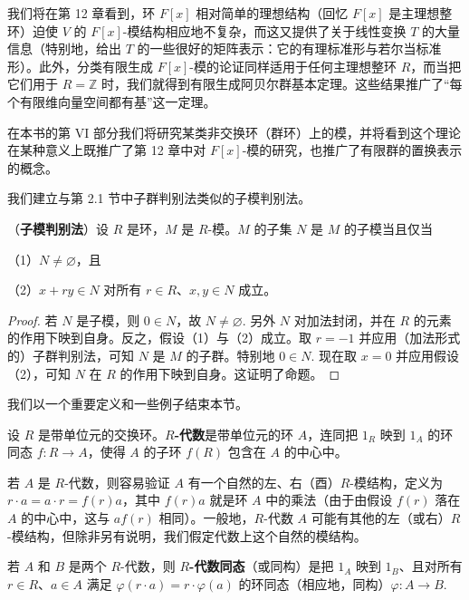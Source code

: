 我们将在第 12 章看到，环 \(F[x]\) 相对简单的理想结构（回忆 \(F[x]\) 是主理想整环）迫使 \(V\) 的 \(F[x]\)-模结构相应地不复杂，而这又提供了关于线性变换 \(T\) 的大量信息（特别地，给出 \(T\) 的一些很好的矩阵表示：它的有理标准形与若尔当标准形）。此外，分类有限生成 \(F[x]\)-模的论证同样适用于任何主理想整环 \(R\)，而当把它们用于 \(R = \mathbb{Z}\) 时，我们就得到有限生成阿贝尔群基本定理。这些结果推广了“每个有限维向量空间都有基”这一定理。

在本书的第 VI 部分我们将研究某类非交换环（群环）上的模，并将看到这个理论在某种意义上既推广了第 12 章中对 \(F[x]\)-模的研究，也推广了有限群的置换表示的概念。

我们建立与第 2.1 节中子群判别法类似的子模判别法。

\begin{proposition}\label{pro:10.1}
（\textbf{子模判别法}）设 \(R\) 是环，\(M\) 是 \(R\)-模。\(M\) 的子集 \(N\) 是 \(M\) 的子模当且仅当

（1）\(N \neq \varnothing\)，且

（2）\(x+ry \in N\) 对所有 \(r \in R\)、\(x, y \in N\) 成立。
\end{proposition}

\begin{proof}
若 \(N\) 是子模，则 \(0 \in N\)，故 \(N \neq \varnothing\). 另外 \(N\) 对加法封闭，并在 \(R\) 的元素的作用下映到自身。反之，假设（1）与（2）成立。取 \(r = -1\) 并应用（加法形式的）子群判别法，可知 \(N\) 是 \(M\) 的子群。特别地 \(0 \in N\). 现在取 \(x = 0\) 并应用假设（2），可知 \(N\) 在 \(R\) 的作用下映到自身。这证明了命题。
\end{proof}

我们以一个重要定义和一些例子结束本节。

\begin{definition}
设 \(R\) 是带单位元的交换环。\textbf{\(R\)-代数}是带单位元的环 \(A\)，连同把 \(1_R\) 映到 \(1_A\) 的环同态 \(f : R \to A\)，使得 \(A\) 的子环 \(f(R)\) 包含在 \(A\) 的中心中。
\end{definition}

若 \(A\) 是 \(R\)-代数，则容易验证 \(A\) 有一个自然的左、右（酉）\(R\)-模结构，定义为 \(r \cdot a = a \cdot r = f(r)a\)，其中 \(f(r)a\) 就是环 \(A\) 中的乘法（由于由假设 \(f(r)\) 落在 \(A\) 的中心中，这与 \(af(r)\) 相同）。一般地，\(R\)-代数 \(A\) 可能有其他的左（或右）\(R\)-模结构，但除非另有说明，我们假定代数上这个自然的模结构。

\begin{definition}
若 \(A\) 和 \(B\) 是两个 \(R\)-代数，则 \textbf{\(R\)-代数同态}（或同构）是把 \(1_A\) 映到 \(1_B\)、且对所有 \(r \in R\)、\(a \in A\) 满足 \(\varphi(r \cdot a) = r \cdot \varphi(a)\) 的环同态（相应地，同构）\(\varphi : A \to B\).
\end{definition}

